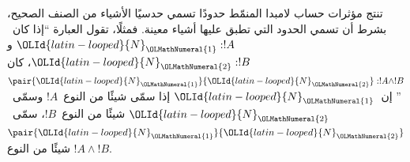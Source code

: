 \documentclass[../../../include/open-logic-section]{subfiles}
\begin{document}
تنتج مؤثرات حساب لامبدا المنمّط حدودًا تسمي حدسيًا الأشياء من الصنف الصحيح،
بشرط أن تسمي الحدود التي تطبق عليها أشياء معينة. فمثلًا، تقول العبارة
``إذا كان~$\OLId{latin-looped}{N}_\OLMathNumeral{1}:!A$ و$\OLId{latin-looped}{N}_\OLMathNumeral{2}:!B$، كان
$\pair{\OLId{latin-looped}{N}_\OLMathNumeral{1}}{\OLId{latin-looped}{N}_\OLMathNumeral{2}}:!A\land !B$'' إن~$\OLId{latin-looped}{N}_\OLMathNumeral{1}$ إذا سمّى شيئًا من النوع~$!A$
وسمّى~$\OLId{latin-looped}{N}_\OLMathNumeral{2}$ شيئًا من النوع~$!B$، سمّى~$\pair{\OLId{latin-looped}{N}_\OLMathNumeral{1}}{\OLId{latin-looped}{N}_\OLMathNumeral{2}}$ شيئًا من النوع
$!A\land !B$.
\end{document}
